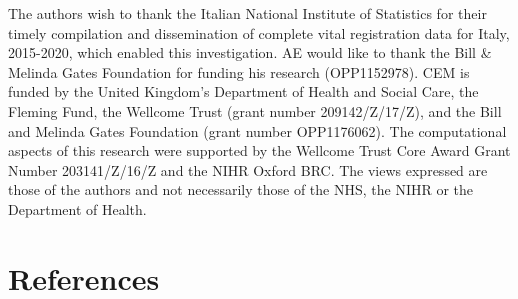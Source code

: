 \documentclass[
]{article}
\begin{document}
The authors wish to thank the Italian National Institute of Statistics for their timely compilation and dissemination of complete vital registration data for Italy, 2015-2020, which enabled this investigation. AE would like to thank the Bill \& Melinda Gates Foundation for funding his research (OPP1152978). CEM is funded by the United Kingdom's Department of Health and Social Care, the Fleming Fund, the Wellcome Trust (grant number 209142/Z/17/Z), and the Bill and Melinda Gates Foundation (grant number OPP1176062). The computational aspects of this research were supported by the Wellcome Trust Core Award Grant Number 203141/Z/16/Z and the NIHR Oxford BRC. The views expressed are those of the authors and not necessarily those of the NHS, the NIHR or the Department of Health.

\hypertarget{references}{%
\section{References}\label{references}}
\end{document}
